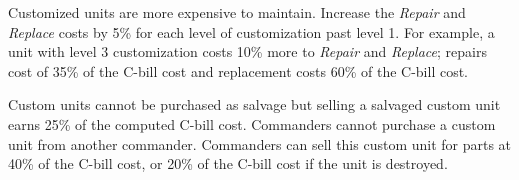 Customized units are more expensive to maintain.
Increase the \emph{Repair} and \emph{Replace} costs by 5\% for each level of customization past level 1.
For example, a unit with level 3 customization costs 10\% more to \emph{Repair} and \emph{Replace}; repairs cost of 35\% of the C-bill cost and replacement costs 60\% of the C-bill cost.

Custom units cannot be purchased as salvage but selling a salvaged custom unit earns 25\% of the computed C-bill cost.
Commanders cannot purchase a custom unit from another commander.
Commanders can sell this custom unit for parts at 40\% of the C-bill cost, or 20\% of the C-bill cost if the unit is destroyed.
